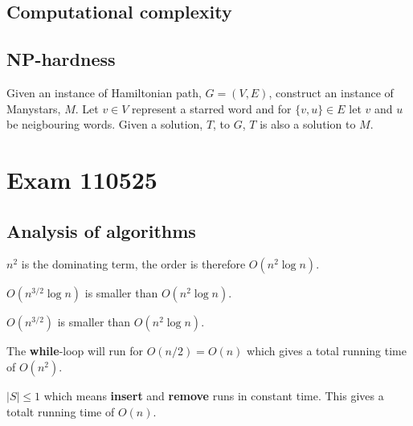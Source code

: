 \documentclass[a4paper]{article}
\newenvironment{task}[1]
{
	\begin{description}[align=right]
		\item [#1]
}{		%
	\end{description}
}
\newcommand{\abs}[1]{\left|#1\right|}
\DeclareMathOperator{\*}{\cdot}
\begin{document}
\subsection*{Computational complexity}

\begin{task}{10. (a)}
\end{task}

\subsection*{NP-hardness}

\begin{task}{12. (f)}
	\qquad Given an instance of Hamiltonian path, $G=(V,E)$, construct an instance of Manystars, $M$. Let $v\in V$ represent a starred word and for $\{v,u\}\in E$ let $v$ and $u$ be neigbouring words. Given a solution, $T$, to $G$, $T$ is also a solution to $M$.
\end{task}

\pagebreak
\section*{Exam 110525}
\subsection*{Analysis of algorithms}

\begin{task}{1. (a)}
	 $n^2$ is the dominating term, the order is therefore $O(n^2\log n)$.
\end{task}

\begin{task}{(b)}
	 $O(n^{3/2}\log n)$ is smaller than $O(n^2\log n)$.
\end{task}

\begin{task}{(c)}
	 $O(n^{3/2})$ is smaller than $O(n^2\log n)$.
\end{task}

\begin{task}{2. (a)}
	 The \textbf{while}-loop will run for $O(n/2)=O(n)$ which gives a total running time of $O(n^2)$.
\end{task}

\begin{task}{3. (a)}
	 $\abs{S}\leq 1$ which means \textbf{insert} and \textbf{remove} runs in constant time. This gives a totalt running time of $O(n)$.
\end{task}
\end{document}
